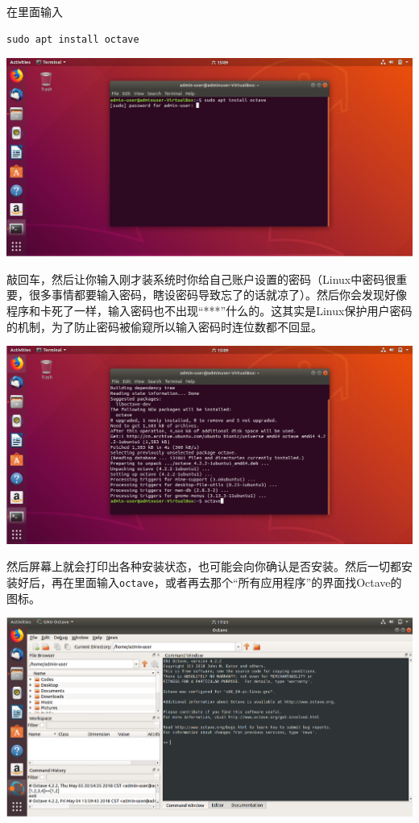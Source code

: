 \documentclass[12pt]{article}
\begin{document}
\begin{spacing}{1.4}
在里面输入

\begin{lstlisting}
sudo apt install octave    
\end{lstlisting}

\includegraphics[width=\linewidth]{ubuntu2.png}

敲回车，然后让你输入刚才装系统时你给自己账户设置的密码（Linux中密码很重要，很多事情都要输入密码，瞎设密码导致忘了的话就凉了）。然后你会发现好像程序和卡死了一样，输入密码也不出现“***”什么的。这其实是Linux保护用户密码的机制，为了防止密码被偷窥所以输入密码时连位数都不回显。

\includegraphics[width=\linewidth]{ubuntu3.png}

然后屏幕上就会打印出各种安装状态，也可能会向你确认是否安装。然后一切都安装好后，再在里面输入\texttt{octave}，或者再去那个“所有应用程序”的界面找Octave的图标。

\includegraphics[width=\linewidth]{octave_ubuntu.png}


\end{spacing}
\end{document}
